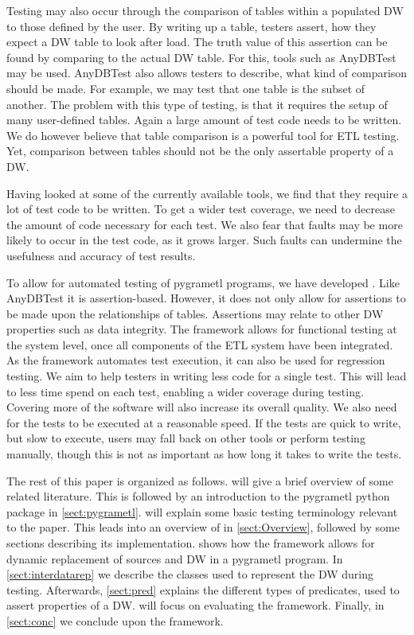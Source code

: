 Testing may also occur through the comparison of tables within a populated DW to those defined by the user. By writing up a table, testers assert, how they expect a DW table to look after load. The truth value of this assertion can be found by comparing to the actual DW table. For this, tools such as AnyDBTest\cite{AnyDbTest} may be used. AnyDBTest also allows testers to describe, what kind of comparison should be made. For example, we may test that one table is the subset of another. The problem with this type of testing, is that it requires the setup of many user-defined tables. Again a large amount of test code needs to be written. We do however believe that table comparison is a powerful tool for ETL testing. Yet, comparison between tables should not be the only assertable property of a DW.

Having looked at some of the currently available tools, we find that they require a lot of test code to be written. To get a wider test coverage, we need to decrease the amount of code necessary for each test. We also fear that faults may be more likely to occur in the test code, as it grows larger. Such faults can undermine the usefulness and accuracy of test results.

To allow for automated testing of pygrametl programs, we have developed \FW{}. Like AnyDBTest it is assertion-based. However, it does not only allow for assertions to be made upon the relationships of tables. Assertions may relate to other DW properties such as data integrity. The framework allows for functional testing at the system level, once all components of the ETL system have been integrated. As the framework automates test execution, it can also be used for regression testing. We aim to help testers in writing less code for a single test. This will lead to less time spend on each test, enabling a wider coverage during testing. Covering more of the software will also increase its overall quality. We also need for the tests to be executed at a reasonable speed. If the tests are quick to write, but slow to execute, users may fall back on other tools or perform testing manually, though this is not as important as how long it takes to write the tests.

The rest of this paper is organized as follows.  will give a brief overview of some related literature. This is followed by an introduction to the pygrametl python package in \cref{sect:pygrametl}.  will explain some basic testing terminology relevant to the paper. This leads into an overview of \FW{} in \cref{sect:Overview}, followed by some sections describing its implementation.  shows how the framework allows for dynamic replacement of sources and DW in a pygrametl program.  In \cref{sect:interdatarep} we describe the classes used to represent the DW during testing. Afterwards, \cref{sect:pred} explains the different types of predicates, used to assert properties of a DW.  will focus on evaluating the framework. Finally, in \cref{sect:conc} we conclude upon the framework.


